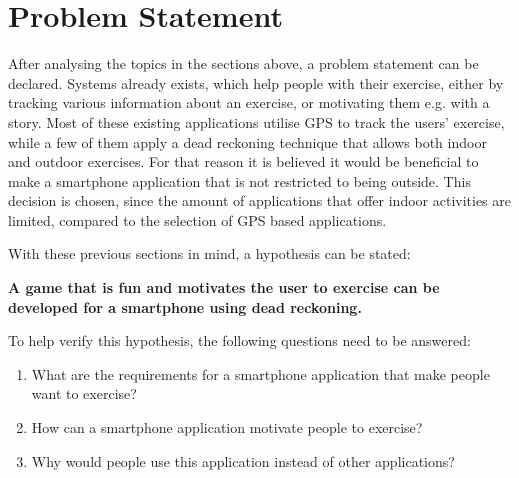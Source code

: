 \section{Problem Statement}\label{section:problemstatement}
After analysing the topics in the sections above, a problem statement can be declared. 
Systems already exists, which help people with their exercise, either by tracking various information about an exercise, or motivating them e.g. with a story. 
Most of these existing applications utilise GPS to track the users' exercise, while a few of them apply a dead reckoning technique that allows both indoor and outdoor exercises.
For that reason it is believed it would be beneficial to make a smartphone application that is not restricted to being outside.
This decision is chosen, since the amount of applications that offer indoor activities are limited, compared to the selection of GPS based applications.

With these previous sections in mind, a hypothesis can be stated:
\begin{center}
\textbf{A game that is fun and motivates the user to exercise can be developed for a smartphone using dead reckoning.}
\end{center}

To help verify this hypothesis, the following questions need to be answered:

\begin{enumerate}
	\item What are the requirements for a smartphone application that make people want to exercise?
	\item How can a smartphone application motivate people to exercise?
	\item Why would people use this application instead of other applications?
\end{enumerate} 
